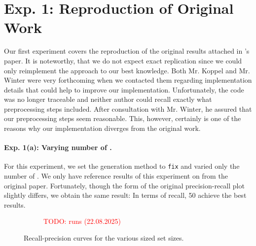 
\section{Exp. 1: Reproduction of Original Work}

Our first experiment covers the reproduction of the original results attached in \citet{koppel_determining_2014}'s paper.
It is noteworthy, that we do not expect exact replication since we could only reimplement the approach to our best knowledge.
Both Mr. Koppel and Mr. Winter were very forthcoming when we contacted them regarding implementation details that could help to improve our implementation.
Unfortunately, the code was no longer traceable and neither author could recall exactly what preprocessing steps included.
After consultation with Mr. Winter, he assured that our preprocessing steps seem reasonable.
This, however, certainly is one of the reasons why our implementation diverges from the original work.

\paragraph{Exp. 1(a): Varying number of \imps{}.}

For this experiment, we set the \imp{} generation method to \texttt{fix} and varied only the number of \imps{}.
We only have reference results of this experiment on \dataBlog{} from the original paper.
Fortunately, though the form of the original precision-recall plot slightly differs, we obtain the same result:
In terms of recall, 50 \imps{} achieve the best results.

\begin{figure}[htbp]
  \centering
  \begin{subfigure}[b]{0.48\textwidth}
    \centering
    
    \caption{\dataBlog{} \textcolor{red}{TODO: runs (22.08.2025)}}
    \label{fig:blog_dif_n}
  \end{subfigure}
  \hfill
  \begin{subfigure}[b]{0.48\textwidth}
    \centering
    
    \caption{\dataStudent{}}
    \label{fig:student_essays_dif_n}
  \end{subfigure}
  \caption{Recall-precision curves for the various sized \imp{} set sizes.}
  \label{fig:repr_diff_n_imps_fixed}
\end{figure}


